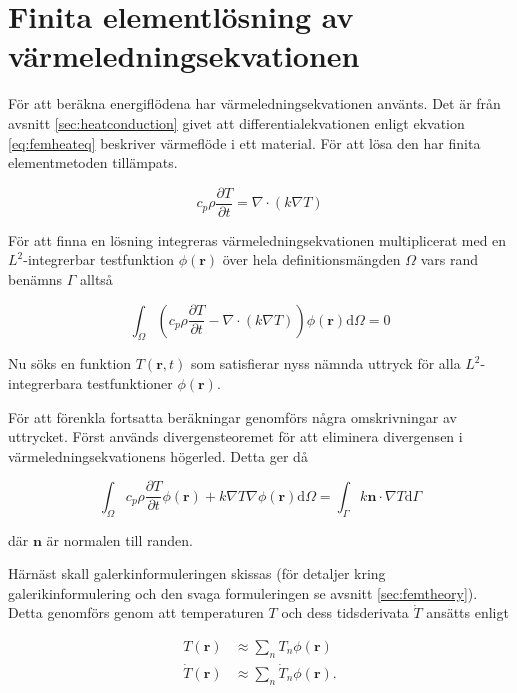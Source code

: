 \section{Finita elementlösning av värmeledningsekvationen}
\label{sec:femheat}
För att beräkna energiflödena har värmeledningsekvationen använts.
Det är från avsnitt \ref{sec:heatconduction} givet att differentialekvationen
enligt ekvation \eqref{eq:femheateq} beskriver värmeflöde i ett material.
För att lösa den har  finita elementmetoden tillämpats.
 
\begin{equation}
\label{eq:femheateq}
c_p\rho\frac{\partial T}{\partial t} = \nabla\cdot(k\nabla T)
\end{equation}

För att finna en lösning integreras värmeledningsekvationen
multiplicerat med en $L^2$-integrerbar testfunktion $\phi(\mathbf{r})$ över hela
definitionsmängden $\Omega$ vars rand benämns $\Gamma$ alltså

\begin{equation}
\label{eq:femheatweak}
\int_\Omega \left(c_p\rho\frac{\partial T}{\partial t} -
\nabla\cdot(k\nabla T)\right)\phi(\mathbf{r})\mathrm{d}\Omega = 0
\end{equation}

Nu söks en funktion $T(\mathbf{r},t)$ som satisfierar nyss nämnda uttryck för
alla $L^2$-integrerbara testfunktioner $\phi(\mathbf{r})$.

För att förenkla fortsatta beräkningar genomförs några
omskrivningar av uttrycket. Först används divergensteoremet för att 
eliminera divergensen i värmeledningsekvationens högerled. Detta ger då

\begin{equation}
\label{eq:femheatweakfull}
\int_\Omega c_p\rho\frac{\partial T}{\partial t}\phi(\mathbf{r}) +
k\nabla T\nabla\phi(\mathbf{r}) \mathrm{d}\Omega =
\int_\Gamma k\mathbf{n}\cdot\nabla T\mathrm{d}\Gamma
\end{equation}

där $\mathbf{n}$ är normalen till randen.

Härnäst skall galerkinformuleringen skissas (för detaljer kring galerikinformulering och den svaga formuleringen se avsnitt \ref{sec:femtheory}). Detta genomförs
genom att temperaturen $T$ och dess tidsderivata $\dot{T}$ ansätts
enligt

\begin{align}
\label{eq:femheatt}
T(\mathbf{r}) & \approx \sum_n T_n\phi(\mathbf{r}) \\
\label{eq:femheattdot}
\dot{T}(\mathbf{r}) & \approx \sum_n \dot{T}_n\phi(\mathbf{r}).
\end{align}

